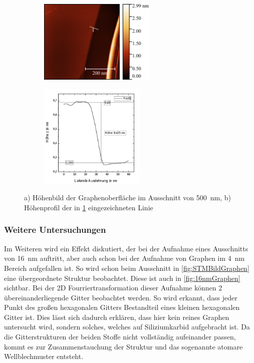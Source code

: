 \documentclass[a4paper,twoside,final]{article}
\begin{document}
\begin{figure}[h]
    \centering
    \begin{subfigure}{0.45\textwidth}
        \includegraphics[height=4cm]{Bilder/Image02125_Kantenmessung_Graphen_richtig_mitLinie.pdf}
        \caption{ }
        \label{fig:Kante}
    \end{subfigure}
    \hspace{0.5cm}
    \begin{subfigure}{0.45\textwidth}
        \includegraphics[height=5cm]{Bilder/Graphen_Kante.pdf}
        \caption{ }
        \label{fig:KanteHöhe}
    \end{subfigure}
    \caption{ a) Höhenbild der Graphenoberfläche im Ausschnitt von \SI{500}{\nano\meter}, b) Höhenprofil der in \ref{fig:Kante} eingezeichneten Linie}
\end{figure}
\FloatBarrier

\subsubsection{Weitere Untersuchungen}
Im Weiteren wird ein Effekt diskutiert, der bei der Aufnahme eines Ausschnitts von \SI{16}{\nano\meter} auftritt, aber auch schon bei der Aufnahme von Graphen im \SI{4}{\nano\meter} Bereich aufgefallen ist. So wird schon beim Ausschnitt in \ref{fig:STMBildGraphen} eine übergeordnete Struktur beobachtet. Diese ist auch in \ref{fig:16nmGraphen} sichtbar. Bei der 2D Fourriertransformation dieser Aufnahme können 2 übereinanderliegende Gitter beobachtet werden. So wird erkannt, dass jeder Punkt des großen hexagonalen Gitters Bestandteil eines kleinen hexagonalen Gitter ist. Dies lässt sich dadurch erklären, dass hier kein reines Graphen untersucht wird, sondern solches, welches auf Siliziumkarbid aufgebracht ist. Da die Gitterstrukturen der beiden Stoffe nicht vollständig aufeinander passen, kommt es zur Zusammenstauchung der Struktur und das sogenannte atomare Wellblechmuster entsteht. \\
\end{document}
